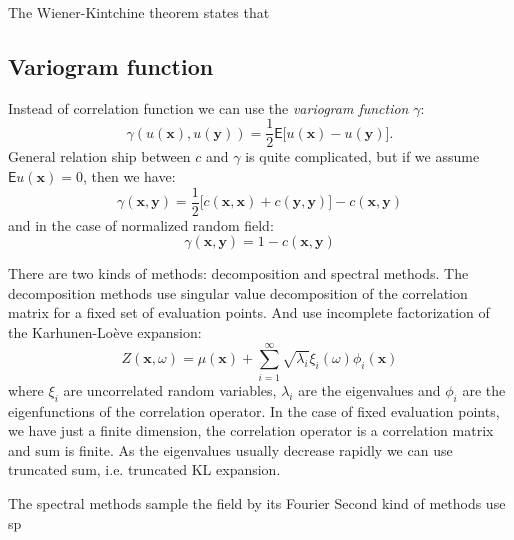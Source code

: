 \documentclass{article}
\def\vc#1{\mathbf{\boldsymbol{#1}}}     %
\def \E{{\mathsf E}}
\begin{document}
The Wiener-Kintchine theorem states that
\cite{}

\subsection{Variogram function}
Instead of correlation function we can use the \emph{variogram function} $\gamma$:
\[
    \gamma(u(\vc x), u(\vc y)) = \frac12 \E\big[u(\vc x) - u(\vc y)\big].
\]
General relation ship between $c$ and $\gamma$ is quite complicated, but if we assume $\E u(\vc x) = 0$, then
we have:
\[
    \gamma(\vc x, \vc y) = \frac12 \big[ c(\vc x, \vc x) + c(\vc y, \vc y)\big] - c(\vc x, \vc y)
\]
and in the case of normalized random field:
\[
    \gamma(\vc x, \vc y) = 1 - c(\vc x, \vc y)
\]


There are two kinds of methods: decomposition and spectral methods. The decomposition methods use singular value decomposition of the correlation matrix for a fixed set of evaluation points. And use incomplete factorization of the Karhunen-Lo\`eve expansion:
\[
    Z(\vc x, \omega) = \mu(\vc x) +  \sum_{i = 1}^\infty \sqrt{\lambda_i} \xi_i(\omega) \phi_i(\vc x)
\]
where  $\xi_i$ are uncorrelated random variables, $\lambda_i$ are the eigenvalues and  $\phi_i$ are 
the eigenfunctions of the correlation operator. In the case of fixed evaluation points, we have just a finite
dimension, the correlation operator is a correlation matrix and sum is finite. As the eigenvalues usually decrease
rapidly we can use truncated sum, i.e. truncated KL expansion.

The spectral methods sample the field by its Fourier Second kind of methods use sp
\end{document}
